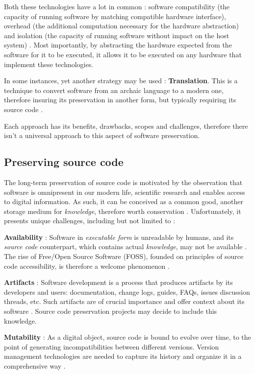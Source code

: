 \documentclass[11pt]{article}
\begin{document}
Both these technologies have a lot in common : software compatibility (the capacity of running software by matching compatible hardware interface), overhead (the additional computation necessary for the hardware abstraction) and isolation (the capacity of running software without impact on the host system) \cite{rosenblum2004reincarnation}. Most importantly, by abstracting the hardware expected from the software for it to be executed, it allows it to be executed on any hardware that implement these technologies.

In some instances, yet another strategy may be used : \textbf{Translation}. This is a technique to convert software from an archaic language to a modern one, therefore insuring its preservation in another form, but typically requiring its source code \cite{swalwell2009towards}.

Each approach has its benefits, drawbacks, scopes and challenges, therefore there isn't a universal approach to this aspect of software preservation.


\subsection{Preserving source code}

The long-term preservation of source code is motivated by the observation that software is omnipresent in our modern life, scientific research and enables access to digital information. As such, it can be conceived as a common good, another storage medium for \textit{knowledge}, therefore worth conservation \cite{di2017software}. Unfortunately, it presents unique challenges, including but not limited to :

\textbf{Availability} : Software in \textit{executable form} is unreadable by humans, and its \textit{source code} counterpart, which contains actual \textit{knowledge}, may not be available \cite{di2017software}. The rise of Free/Open Source Software (FOSS), founded on principles of source code accessibility, is therefore a welcome phenomenon \cite{schweik2012internet}.

\textbf{Artifacts} : Software development is a process that produces artifacts by its developers and users: documentation, change logs, guides, FAQs, issues discussion threads, etc. Such artifacts are of crucial importance and offer context about its software \cite{di2017software,corrado2019software}. Source code preservation projects may decide to include this knowledge.

\textbf{Mutability} : As a digital object, source code is bound to evolve over time, to the point of generating incompatibilities between different versions. Version management technologies are needed to capture its history and organize it in a comprehensive way \cite{di2017software,holzmann2016archiving}.
\end{document}
